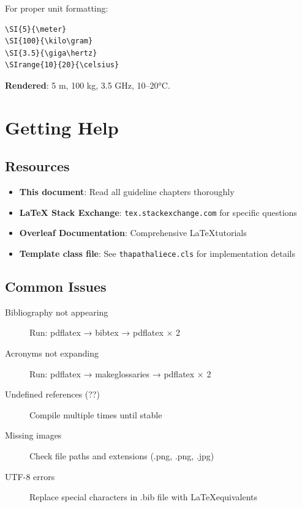 For proper unit formatting:

\begin{verbatim}
\SI{5}{\meter}
\SI{100}{\kilo\gram}
\SI{3.5}{\giga\hertz}
\SIrange{10}{20}{\celsius}
\end{verbatim}

\textbf{Rendered}: 5 m, 100 kg, 3.5 GHz, 10--20°C.

\section*{Getting Help}

\subsection*{Resources}

\begin{itemize}
    \item \textbf{This document}: Read all guideline chapters thoroughly
    \item \textbf{LaTeX Stack Exchange}: \texttt{tex.stackexchange.com} for specific questions
    \item \textbf{Overleaf Documentation}: Comprehensive \LaTeX tutorials
    \item \textbf{Template class file}: See \texttt{thapathaliece.cls} for implementation details
\end{itemize}

\subsection*{Common Issues}

\begin{description}
    \item[Bibliography not appearing] Run: pdflatex → bibtex → pdflatex × 2
    \item[Acronyms not expanding] Run: pdflatex → makeglossaries → pdflatex × 2
    \item[Undefined references (??)] Compile multiple times until stable
    \item[Missing images] Check file paths and extensions (.png, .png, .jpg)
    \item[UTF-8 errors] Replace special characters in .bib file with \LaTeX equivalents
\end{description}




